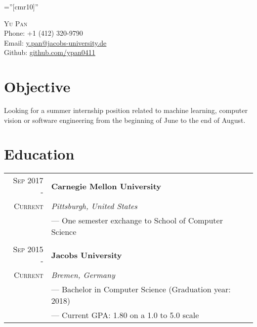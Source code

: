 \documentclass[a4paper,10pt]{article}
\begin{document}
	
	
	\pagestyle{empty} %
	
	\font\fb=''[cmr10]'' %
	
	\par{\centering
		{\huge{\textsc{Yu Pan}}}\\
		Phone: +1 (412) 320-9790 \\
		Email: \href{mailto:y.pan@jacobs-university.de}{y.pan@jacobs-university.de}\\
		Github: \href{https://github.com/ypan0411}{github.com/ypan0411} \par}
	
	\section{Objective}
	Looking for a summer internship position related to machine learning, computer vision or software engineering from the beginning of June to the end of August.
	
	
	\section{Education}
	\begin{tabular}{r|l}
	    \textsc{Sep 2017 - } & \textbf{Carnegie Mellon University} \\\textsc{Current}&\emph{Pittsburgh, United States}
		\\& --- One semester exchange to School of Computer Science
		\\ \multicolumn{1}{c}{} \\
		\textsc{Sep 2015 - } & \textbf{Jacobs University} \\\textsc{Current}&\emph{Bremen, Germany}
		\\& --- Bachelor in Computer Science (Graduation year: 2018)
		\\& --- Current GPA: 1.80 on a 1.0 to 5.0 scale
	\end{tabular}
	
\end{document}

